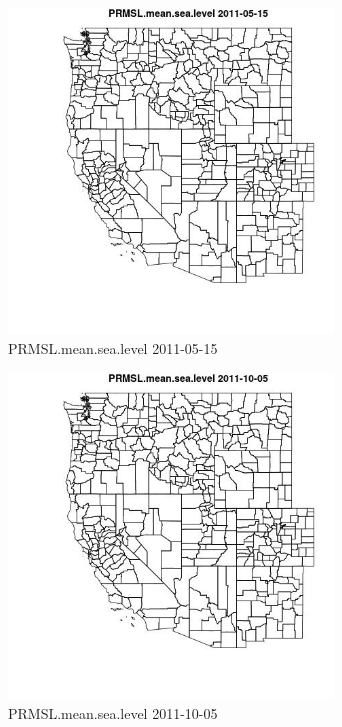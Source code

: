 \begin{figure} 
\centering  
\includegraphics[width=0.77\textwidth]{Code_Outputs/ML_input_report_ML_input_PM25_Step5_part_d_de_duplicated_aves_ML_input_MapObsPRMSLmeansealevel2011-05-15.jpg} 
\caption{\label{fig:ML_input_report_ML_input_PM25_Step5_part_d_de_duplicated_aves_ML_inputMapObsPRMSLmeansealevel2011-05-15}PRMSL.mean.sea.level 2011-05-15} 
\end{figure} 
 

\begin{figure} 
\centering  
\includegraphics[width=0.77\textwidth]{Code_Outputs/ML_input_report_ML_input_PM25_Step5_part_d_de_duplicated_aves_ML_input_MapObsPRMSLmeansealevel2011-10-05.jpg} 
\caption{\label{fig:ML_input_report_ML_input_PM25_Step5_part_d_de_duplicated_aves_ML_inputMapObsPRMSLmeansealevel2011-10-05}PRMSL.mean.sea.level 2011-10-05} 
\end{figure} 
 

